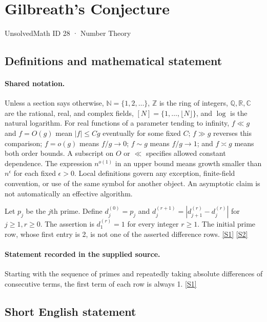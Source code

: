 \documentclass[11pt,a4paper]{article}
\newcommand{\N}{\mathbb{N}}
\newcommand{\Z}{\mathbb{Z}}
\newcommand{\Q}{\mathbb{Q}}
\newcommand{\R}{\mathbb{R}}
\newcommand{\C}{\mathbb{C}}
\newcommand{\sref}[2]{\hyperlink{source:#1:#2}{[S#2]}}
\begin{document}

\setcounter{section}{27}

\section{Gilbreath's Conjecture}\label{28}

{\small\sffamily UnsolvedMath ID 28 · Number Theory}

\subsection{Definitions and mathematical statement}

\paragraph{Shared notation.}Unless a section says otherwise, $\N=\{1,2,\ldots\}$,
$\Z$ is the ring of integers, $\Q,\R,\C$ are the rational, real, and complex
fields, $[N]=\{1,\ldots,\lfloor N\rfloor\}$, and $\log$ is the natural
logarithm. For real functions of a parameter tending to infinity,
$f\ll g$ and $f=O(g)$ mean $|f|\leq Cg$ eventually for some fixed $C$;
$f\gg g$ reverses this comparison; $f=o(g)$ means $f/g\to0$;
$f\sim g$ means $f/g\to1$; and $f\asymp g$ means both order bounds.
A subscript on $O$ or $\ll$ specifies allowed constant dependence.
The expression $n^{o(1)}$ in an upper bound means growth smaller than
$n^\epsilon$ for each fixed $\epsilon>0$. Local definitions govern any
exception, finite-field convention, or use of the same symbol for another
object. An asymptotic claim is not automatically an effective algorithm.



Let $p_j$ be the $j$th prime. Define $d_j^{(0)}=p_j$ and $d_j^{(r+1)}=|d_{j+1}^{(r)}-d_j^{(r)}|$ for $j\geq1,r\geq0$. The assertion is $d_1^{(r)}=1$ for every integer $r\geq1$. The initial prime row, whose first entry is 2, is not one of the asserted difference rows. \sref{28}{1} \sref{28}{2}

\paragraph{Statement recorded in the supplied source.}
Starting with the sequence of primes and repeatedly taking absolute differences of consecutive terms, the first term of each row is always 1. \sref{28}{1}

\subsection{Short English statement}
\end{document}
